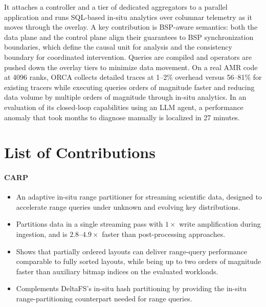 It attaches a controller and a tier of dedicated aggregators to a parallel application and runs
SQL-based in-situ analytics over columnar telemetry as it moves through the overlay.
A key contribution is BSP-aware semantics: both the data plane and the control plane align their
guarantees to BSP synchronization boundaries, which define the causal unit for analysis and the
consistency boundary for coordinated intervention.
Queries are compiled and operators are pushed down the overlay tiers to minimize data movement.
On a real AMR code at 4096 ranks, ORCA collects detailed traces at 1--2\% overhead versus 56--81\%
for existing tracers while executing queries orders of magnitude faster and reducing data volume by
multiple orders of magnitude through in-situ analytics.
In an evaluation of its closed-loop capabilities using an LLM agent, a performance anomaly that
took months to diagnose manually is localized in 27 minutes.


\section{List of Contributions}
\label{sec:intro:contribs}

\paragraph{CARP}
\begin{itemize}
  \item An adaptive in-situ range partitioner for streaming scientific data, designed to accelerate
        range queries under unknown and evolving key distributions.

  \item Partitions data in a single streaming pass with $1\times$ write amplification during
        ingestion,
        and is $2.8$--$4.9\times$ faster than post-processing approaches.

  \item Shows that partially ordered layouts can deliver range-query performance comparable to fully
        sorted layouts, while being up to two orders of magnitude faster than auxiliary bitmap indices
        on the evaluated workloads.

  \item Complements DeltaFS's in-situ hash partitioning by providing the in-situ range-partitioning
        counterpart needed for range queries.
\end{itemize}

